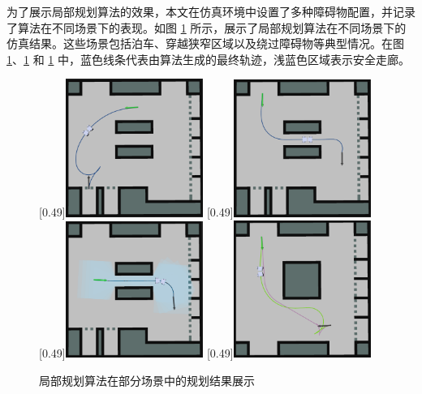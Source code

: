 \documentclass[master,academic]{ysuthesis} %
\begin{document}
	为了展示局部规划算法的效果，本文在仿真环境中设置了多种障碍物配置，并记录了算法在不同场景下的表现。如图 \ref{fig:局部规划仿真案例} 所示，展示了局部规划算法在不同场景下的仿真结果。这些场景包括泊车、穿越狭窄区域以及绕过障碍物等典型情况。在图 \ref{fig:局部规划仿真案例}、\ref{fig:局部规划仿真案例} 和 \ref{fig:局部规划仿真案例} 中，蓝色线条代表由算法生成的最终轨迹，浅蓝色区域表示安全走廊。
	\begin{figure}[H]
		\centering
		[0.49\textwidth]{\includegraphics[width=0.4\textwidth]{s1.png}}
		[0.49\textwidth]{\includegraphics[width=0.4\textwidth]{s2.png}}
		[0.49\textwidth]{\includegraphics[width=0.4\textwidth]{s3.png}}
		[0.49\textwidth]{\includegraphics[width=0.4\textwidth]{s4.png}}
		\caption{局部规划算法在部分场景中的规划结果展示}
		\label{fig:局部规划仿真案例}
	\end{figure}
\end{document}
